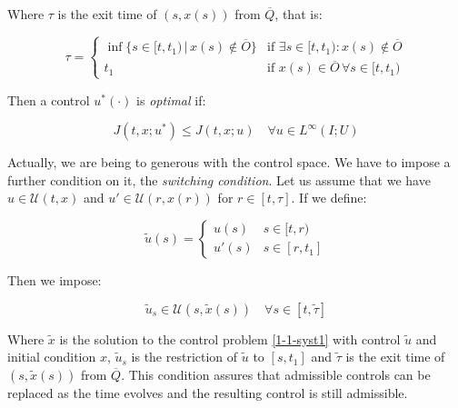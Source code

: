 Where $\tau$ is the exit time of $(s,x(s))$ from $\overline{Q}$, that is:

\begin{equation}\label{1-1-taudef}
    \tau = \begin{cases}
        \inf\{s\in [t,t_1)\,|\, x(s)\notin \overline{O}\} & \text{if } \exists s\in [t,t_1): x(s)\notin\overline{O} \\
        t_1 & \text{if }  x(s)\in\overline{O}\,\forall s\in [t,t_1)
    \end{cases}
\end{equation}

Then a control $u^{\ast}(\cdot)$ is \textit{optimal} if:

\begin{equation}\label{1-1-optimalcondition}
    J(t,x;u^{\ast}) \leq J(t,x;u) \quad \forall u\in L^{\infty}(I;U)
\end{equation}

Actually, we are being to generous with the control space. We have to impose a further condition on it, the \textit{switching condition}.
Let us assume that we have $u\in\mathcal{U}(t,x)$ and $u'\in\mathcal{U}(r,x(r))$ for $r\in[t,\tau]$. If we define:

\begin{equation}\label{1-1-switcond}
    \tilde{u}(s)=\begin{cases}
        u(s) & s\in[t,r) \\
        u'(s) & s\in[r,t_1]
    \end{cases}
\end{equation}

Then we impose:

\begin{equation}
    \tilde{u}_s\in\mathcal{U}(s,\tilde{x}(s)) \quad \forall s\in[t,\tilde{\tau}]
\end{equation}

Where $\tilde{x}$ is the solution to the control problem \ref*{1-1-syst1} with control $\tilde{u}$ and initial condition $x$, 
$\tilde{u}_s$ is the restriction of $\tilde{u}$ to $[s,t_1]$ and $\tilde{\tau}$ is the exit time of $(s,\tilde{x}(s))$ from $\overline{Q}$.
This condition assures that admissible controls can be replaced as the time evolves and the resulting control is still admissible. 